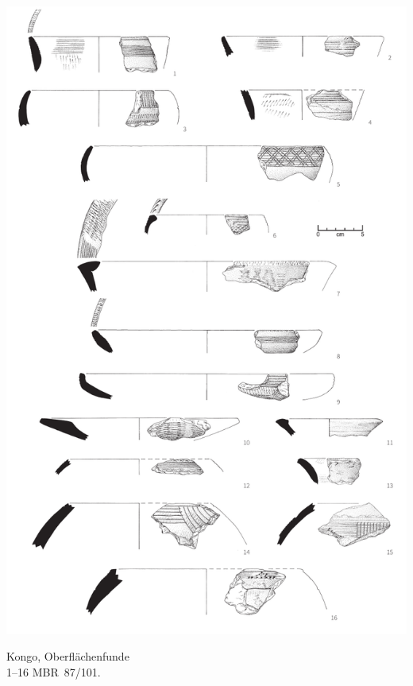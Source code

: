 \begin{pl}[H]
	\includegraphics{plt/Taf29.pdf}
	\vspace{.75em}\caption{Kongo, Oberflächenfunde \\ 1--16 MBR~87/101.}
	\label{pl:29}
\end{pl}

